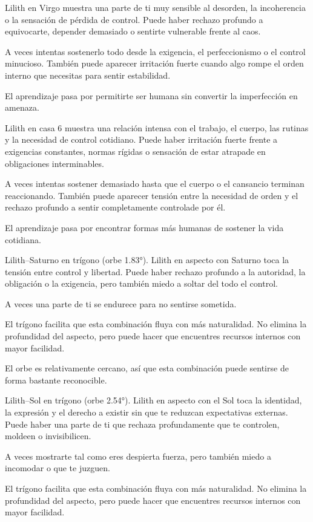 \documentclass[11pt,a4paper]{article}
\begin{document}
Lilith en Virgo muestra una parte de ti muy sensible al desorden, la incoherencia o la sensación de pérdida de control. Puede haber rechazo profundo a equivocarte, depender demasiado o sentirte vulnerable frente al caos.

A veces intentas sostenerlo todo desde la exigencia, el perfeccionismo o el control minucioso. También puede aparecer irritación fuerte cuando algo rompe el orden interno que necesitas para sentir estabilidad.

El aprendizaje pasa por permitirte ser humana sin convertir la imperfección en amenaza.

Lilith en casa 6 muestra una relación intensa con el trabajo, el cuerpo, las rutinas y la necesidad de control cotidiano. Puede haber irritación fuerte frente a exigencias constantes, normas rígidas o sensación de estar atrapade en obligaciones interminables.

A veces intentas sostener demasiado hasta que el cuerpo o el cansancio terminan reaccionando. También puede aparecer tensión entre la necesidad de orden y el rechazo profundo a sentir completamente controlade por él.

El aprendizaje pasa por encontrar formas más humanas de sostener la vida cotidiana.

Lilith–Saturno en trígono (orbe 1.83°).
Lilith en aspecto con Saturno toca la tensión entre control y libertad. Puede haber rechazo profundo a la autoridad, la obligación o la exigencia, pero también miedo a soltar del todo el control.

A veces una parte de ti se endurece para no sentirse sometida.

El trígono facilita que esta combinación fluya con más naturalidad. No elimina la profundidad del aspecto, pero puede hacer que encuentres recursos internos con mayor facilidad.

El orbe es relativamente cercano, así que esta combinación puede sentirse de forma bastante reconocible.

Lilith–Sol en trígono (orbe 2.54°).
Lilith en aspecto con el Sol toca la identidad, la expresión y el derecho a existir sin que te reduzcan expectativas externas. Puede haber una parte de ti que rechaza profundamente que te controlen, moldeen o invisibilicen.

A veces mostrarte tal como eres despierta fuerza, pero también miedo a incomodar o que te juzguen.

El trígono facilita que esta combinación fluya con más naturalidad. No elimina la profundidad del aspecto, pero puede hacer que encuentres recursos internos con mayor facilidad.
\end{document}
